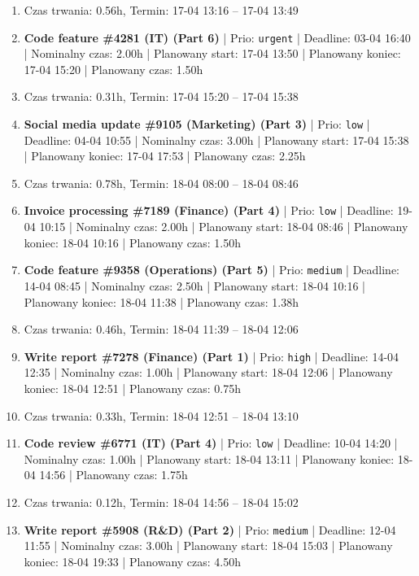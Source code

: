 {\begin{enumerate}
  \item [\textbf{PRZERWA}] Czas trwania: 0.56h, Termin: 17-04 13:16 -- 17-04 13:49
  \item [\textbf{14604}] \textbf{Code feature \#4281 (IT) (Part 6)} | Prio: \texttt{urgent} | Deadline: 03-04 16:40 | Nominalny czas: 2.00h | Planowany start: 17-04 13:50 | Planowany koniec: 17-04 15:20 | Planowany czas: 1.50h
  \item [\textbf{PRZERWA}] Czas trwania: 0.31h, Termin: 17-04 15:20 -- 17-04 15:38
  \item [\textbf{14698}] \textbf{Social media update \#9105 (Marketing) (Part 3)} | Prio: \texttt{low} | Deadline: 04-04 10:55 | Nominalny czas: 3.00h | Planowany start: 17-04 15:38 | Planowany koniec: 17-04 17:53 | Planowany czas: 2.25h
  \item [\textbf{PRZERWA}] Czas trwania: 0.78h, Termin: 18-04 08:00 -- 18-04 08:46
  \item [\textbf{14678}] \textbf{Invoice processing \#7189 (Finance) (Part 4)} | Prio: \texttt{low} | Deadline: 19-04 10:15 | Nominalny czas: 2.00h | Planowany start: 18-04 08:46 | Planowany koniec: 18-04 10:16 | Planowany czas: 1.50h
  \item [\textbf{14661}] \textbf{Code feature \#9358 (Operations) (Part 5)} | Prio: \texttt{medium} | Deadline: 14-04 08:45 | Nominalny czas: 2.50h | Planowany start: 18-04 10:16 | Planowany koniec: 18-04 11:38 | Planowany czas: 1.38h
  \item [\textbf{PRZERWA}] Czas trwania: 0.46h, Termin: 18-04 11:39 -- 18-04 12:06
  \item [\textbf{14609}] \textbf{Write report \#7278 (Finance) (Part 1)} | Prio: \texttt{high} | Deadline: 14-04 12:35 | Nominalny czas: 1.00h | Planowany start: 18-04 12:06 | Planowany koniec: 18-04 12:51 | Planowany czas: 0.75h
  \item [\textbf{PRZERWA}] Czas trwania: 0.33h, Termin: 18-04 12:51 -- 18-04 13:10
  \item [\textbf{14681}] \textbf{Code review \#6771 (IT) (Part 4)} | Prio: \texttt{low} | Deadline: 10-04 14:20 | Nominalny czas: 1.00h | Planowany start: 18-04 13:11 | Planowany koniec: 18-04 14:56 | Planowany czas: 1.75h
  \item [\textbf{PRZERWA}] Czas trwania: 0.12h, Termin: 18-04 14:56 -- 18-04 15:02
  \item [\textbf{14674}] \textbf{Write report \#5908 (R\&D) (Part 2)} | Prio: \texttt{medium} | Deadline: 12-04 11:55 | Nominalny czas: 3.00h | Planowany start: 18-04 15:03 | Planowany koniec: 18-04 19:33 | Planowany czas: 4.50h

\end{enumerate}}
